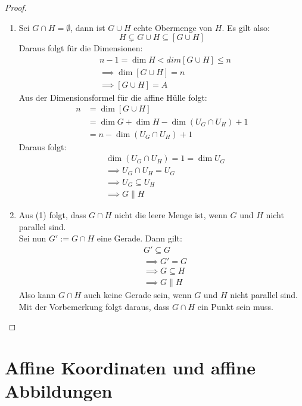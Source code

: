 \documentclass[parskip,a4paper,twoside,DIV15,BCOR12mm]{scrbook}
\begin{document}
\begin{comment}
$\dim{G\cap H}\le\dim{G}=1 \implies G\cap H=\begin{cases}
\emptyset\\
\text{Punkt}\\
\text{Gerade}
\end{cases}$
\end{comment}

\begin{proof}
\begin{enumerate}
\item Sei $G\cap H=\emptyset$, dann ist $G\cup H$ echte Obermenge von $H$. Es gilt also:
\[H \subsetneq G\cup H \subseteq [G\cup H]\]
Daraus folgt für die Dimensionen:
\begin{align*}
&n-1=\dim H < dim[G\cup H]\le n\\
&\implies \dim[G\cup H]=n\\
&\implies [G\cup H]=A
\end{align*}
Aus der Dimensionsformel für die affine Hülle folgt:
\begin{align*}
n&=\dim[G\cup H]\\
&= \dim G+\dim H -\dim(U_G\cap U_H)+1\\
&= n-\dim(U_G\cap U_H)+1
\end{align*}
Daraus folgt:
\begin{align*}
&\dim(U_G\cap U_H)=1=\dim U_G\\
&\implies U_G\cap U_H = U_G\\
&\implies U_G \subseteq U_H\\
&\implies G\parallel H
\end{align*}
\item Aus (1) folgt, dass $G\cap H$ nicht die leere Menge ist, wenn $G$ und $H$ nicht
parallel sind.\\
Sei nun $G':=G\cap H$ eine Gerade. Dann gilt:
\begin{align*}
&G'\subseteq G\\
&\implies G'=G\\
&\implies G\subseteq H\\
&\implies G\parallel H
\end{align*}
Also kann $G\cap H$ auch keine Gerade sein, wenn $G$ und $H$ nicht parallel sind. Mit der
Vorbemerkung folgt daraus, dass $G\cap H$ ein Punkt sein muss.
\end{enumerate}
\end{proof}

\chapter{Affine Koordinaten und affine Abbildungen}
\end{document}

